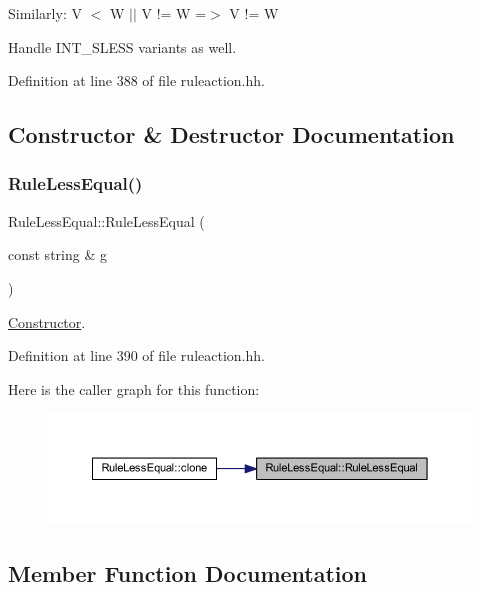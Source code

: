 Similarly\+: {\ttfamily V $<$ W $\vert$$\vert$ V != W =$>$ V != W}

Handle I\+N\+T\+\_\+\+S\+L\+E\+SS variants as well. 

Definition at line 388 of file ruleaction.\+hh.



\subsection{Constructor \& Destructor Documentation}
\mbox{\label{class_rule_less_equal_a74d843e75afced562d6b638e713f1414}} 
\subsubsection{\texorpdfstring{RuleLessEqual()}{RuleLessEqual()}}
{\footnotesize\ttfamily Rule\+Less\+Equal\+::\+Rule\+Less\+Equal (\begin{DoxyParamCaption}\item[{const string \&}]{g }\end{DoxyParamCaption})\hspace{0.3cm}{\ttfamily [inline]}}



\mbox{\hyperlink{class_constructor}{Constructor}}. 



Definition at line 390 of file ruleaction.\+hh.

Here is the caller graph for this function\+:
\nopagebreak
\begin{figure}[H]
\begin{center}
\leavevmode
\includegraphics[width=350pt]{class_rule_less_equal_a74d843e75afced562d6b638e713f1414_icgraph}
\end{center}
\end{figure}


\subsection{Member Function Documentation}
\mbox{\label{class_rule_less_equal_ab76fe328e8caf6ab480a60e3fb1927bf}} 
